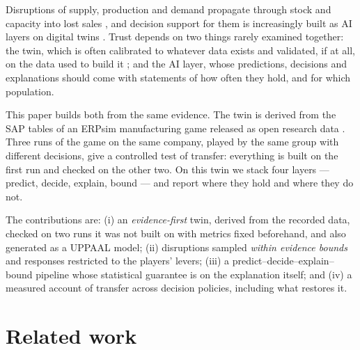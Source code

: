 \documentclass{ifacconf}
\begin{document}
Disruptions of supply, production and demand propagate through stock and capacity into lost sales
\citep{dolgui2018ripple}, and decision support for them is increasingly built as AI layers on digital twins
\citep{ivanov2021digitaltwin,ivanov2023idt,baryannis2019scrm}. Trust depends on two things rarely examined together: the twin,
which is often calibrated to whatever data exists and validated, if at all, on the data used to build it
\citep{sargent2013vv}; and the AI layer, whose predictions, decisions and explanations should come with statements
of how often they hold, and for which population.

This paper builds both from the same evidence. The twin is derived from the SAP tables of an ERPsim
manufacturing game \citep{leger2006erpsim} released as open research data \citep{tritscher2022openerp}. Three runs
of the game on the same company, played by the same group with different decisions, give a controlled test of
transfer: everything is built on the first run and checked on the other two. On this twin we stack four layers
--- predict, decide, explain, bound --- and report where they hold and where they do not.

The contributions are:
(i) an \emph{evidence-first} twin, derived from the recorded data, checked on two runs it was not built on with
metrics fixed beforehand, and also generated as a UPPAAL model;
(ii) disruptions sampled \emph{within evidence bounds} and responses restricted to the players' levers;
(iii) a predict--decide--explain--bound pipeline whose statistical guarantee is on the explanation itself; and
(iv) a measured account of transfer across decision policies, including what restores it.

\section{Related work}
\end{document}
